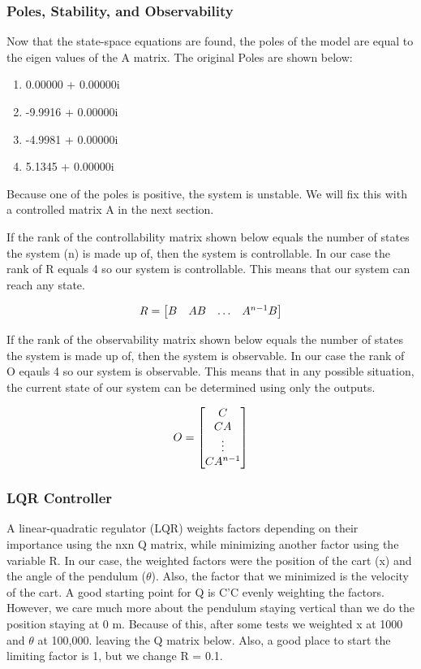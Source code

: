 \documentclass{article}
\begin{document}
\subsubsection{Poles, Stability, and Observability}
Now that the state-space equations are found, the poles of the model are equal to the eigen values of the A matrix. The original Poles are shown below:
\begin{enumerate}
  \item   0.00000 + 0.00000i
  \item -9.9916 + 0.00000i
  \item -4.9981 + 0.00000i
  \item 5.1345 + 0.00000i
\end{enumerate}
Because one of the poles is positive, the system is unstable. We will fix this with a controlled matrix A in the next section.

If the rank of the controllability matrix shown below equals the number of states the system (n) is made up of, then the system is controllable. In our case the rank of R equals 4 so our system is controllable. This means that our system can reach any state.

\begin{equation} 
\label{ctrb}
\centering
R = \begin{bmatrix}
	B&AB&\hdots&A^{n-1}B\\
	\end{bmatrix}
\end{equation}
 
 If the rank of the observability matrix shown below equals the number of states the system is made up of, then the system is observable. In our case the rank of O eqauls 4 so our system is observable. This means that in any possible situation, the current state of our system can be determined using only the outputs.
 
 \begin{equation} 
\label{obsv}
\centering
O = \begin{bmatrix}
	C\\
	CA\\
	\vdots\\
	CA^{n-1}\\
	\end{bmatrix}
\end{equation}

\subsubsection{LQR Controller}
A linear-quadratic regulator (LQR) weights factors depending on their importance using the nxn Q matrix, while minimizing another factor using the variable R. In our case, the weighted factors were the position of the cart (x) and the angle of the pendulum ($\theta$). Also, the factor that we minimized is the velocity of the cart. A good starting point for Q is C'C evenly weighting the factors. However, we care much more about the pendulum staying vertical than we do the position staying at 0 m. Because of this, after some tests we weighted x at 1000 and $\theta$ at 100,000. leaving the Q matrix below. Also, a good place to start the limiting factor is 1, but we change R = 0.1.
\end{document}
